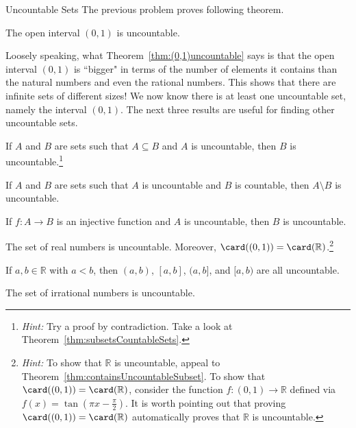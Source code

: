 \begin{section}{Uncountable Sets}
The previous problem proves following theorem.

\begin{theorem}\label{thm:(0,1)uncountable}
The open interval $(0,1)$ is uncountable.
\end{theorem}

Loosely speaking, what Theorem~\ref{thm:(0,1)uncountable} says is that the open interval $(0,1)$ is ``bigger" in terms of the number of elements it contains than the natural numbers and even the rational numbers.  This shows that there are infinite sets of different sizes! We now know there is at least one uncountable set, namely the interval $(0,1)$.  The next three results are useful for finding other uncountable sets.

\begin{theorem}\label{thm:containsUncountableSubset}
If $A$ and $B$ are sets such that $A\subseteq B$ and $A$ is uncountable, then $B$ is uncountable.\footnote{\emph{Hint:} Try a proof by contradiction. Take a look at Theorem~\ref{thm:subsetsCountableSets}.}
\end{theorem}

\begin{corollary}
If $A$ and $B$ are sets such that $A$ is uncountable and $B$ is countable, then $A\setminus B$ is uncountable.
\end{corollary}

\begin{theorem}
If $f:A\to B$ is an injective function and $A$ is uncountable, then $B$ is uncountable.
\end{theorem}

\begin{theorem}
The set of real numbers is uncountable.  Moreover, $\card((0,1))=\card(\mathbb{R})$.\footnote{\emph{Hint:} To show that $\mathbb{R}$ is uncountable, appeal to Theorem~\ref{thm:containsUncountableSubset}. To show that $\card((0,1))=\card(\mathbb{R})$, consider the function $f:(0,1)\to \mathbb{R}$ defined via $f(x)=\tan(\pi x-\frac{\pi}{2})$. It is worth pointing out that proving $\card((0,1))=\card(\mathbb{R})$ automatically proves that $\mathbb{R}$ is uncountable.}
\end{theorem}

\begin{theorem}
If $a,b\in\mathbb{R}$ with $a<b$, then $(a,b)$, $[a,b]$, $(a,b]$, and $[a,b)$ are all uncountable.
\end{theorem}

\begin{theorem}
The set of irrational numbers is uncountable.
\end{theorem}


\end{section}
